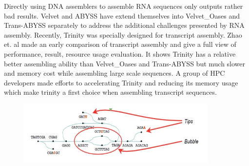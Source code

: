 \documentclass{article}
\begin{document}
Directly using DNA assemblers to assemble RNA sequences only outputs rather bad results. Velvet and ABYSS have extend themselves into Velvet\_Oases \cite{schulz2012oases} and Trans-ABYSS \cite{robertson2010novo} separately to address the additional challenges presented by RNA assembly. Recently, Trinity \cite{grabherr2011full} was specially designed for transcript assembly. Zhao et. al \cite{zhao2011optimizing} made an early comparison of transcript assembly and give a full view of performance, result, resource usage evaluation. It shows Trinity has a relative better assembling ability than Velvet\_Oases and Trans-ABYSS but much slower and memory cost while assembling large scale sequences. A group of HPC developers \cite{henschel2012trinity} made efforts to accelerating Trinity and reducing its memory usage which make trinity a first choice when assembling transcript sequences.
\begin{figure}[ht]
  \centering
  \includegraphics[width=10cm]{Figure7.jpg}\\
  \caption{}\label{branch_example}
\end{figure}
\end{document}
